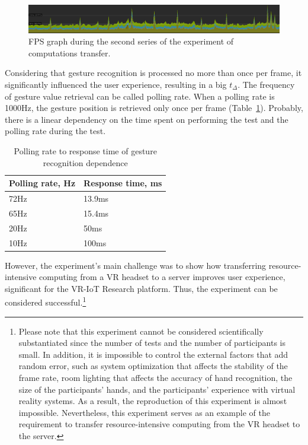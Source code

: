 \begin{figure}
  \centering
  \includegraphics[width = 0.9 \linewidth]{figures/Series1FPS.png}
  \caption{FPS graph during the second series of the experiment of computations transfer.}
  \label{fig:Series1FPSpng-figure}
\end{figure}

Considering that gesture recognition is processed no more than once per frame, it significantly influenced the user experience, resulting in a big $t_{\Delta}$. The frequency of gesture value retrieval can be called polling rate. When a polling rate is 1000Hz, the gesture position is retrieved only once per frame (Table~\ref{tab:polling-rate-table}). Probably, there is a linear dependency on the time spent on performing the test and the polling rate during the test.

\begin{table}
  \centering
  \begin{threeparttable}[c]
    \caption{Polling rate to response time of gesture recognition dependence}
    \label{tab:polling-rate-table}
    \begin{tabular}{ll}
      \toprule
      Polling rate, Hz    & Response time, ms                 \\
      \midrule
      72Hz & 13.9ms \\
      65Hz & 15.4ms \\
      20Hz & 50ms \\
      10Hz & 100ms \\
      \bottomrule
    \end{tabular}
  \end{threeparttable}
\end{table}

However, the experiment's main challenge was to show how transferring resource-intensive computing from a VR headset to a server improves user experience, significant for the VR-IoT Research platform. Thus, the experiment can be considered successful.\footnote{Please note that this experiment cannot be considered scientifically substantiated since the number of tests and the number of participants is small. In addition, it is impossible to control the external factors that add random error, such as system optimization that affects the stability of the frame rate, room lighting that affects the accuracy of hand recognition, the size of the participants' hands, and the participants' experience with virtual reality systems. As a result, the reproduction of this experiment is almost impossible. Nevertheless, this experiment serves as an example of the requirement to transfer resource-intensive computing from the VR headset to the server.
}


